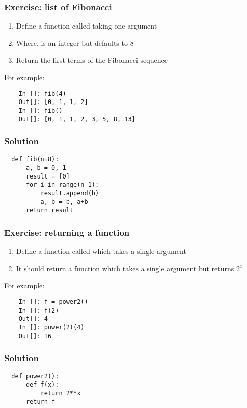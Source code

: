 \documentclass[14pt,compress]{beamer}
\begin{document}
\begin{frame}
  \frametitle{Exercise: list of Fibonacci}
  \begin{enumerate}
  \item Define a function called  taking one argument 
  \item Where,  is an integer but defaults to 8
  \item Return the first  terms of the Fibonacci sequence
  \end{enumerate}
  For example:
  \begin{lstlisting}
    In []: fib(4)
    Out[]: [0, 1, 1, 2]
    In []: fib()
    Out[]: [0, 1, 1, 2, 3, 5, 8, 13]
  \end{lstlisting}
\end{frame}

\begin{frame}
\frametitle{Solution}
\begin{lstlisting}
  def fib(n=8):
      a, b = 0, 1
      result = [0]
      for i in range(n-1):
          result.append(b)
          a, b = b, a+b
      return result
\end{lstlisting}
\end{frame}

\begin{frame}
  \frametitle{Exercise: returning a function}
  \begin{enumerate}
  \item Define a function called  which takes a single argument
  \item It should return a function which takes a single argument  but
    returns $2^x$
  \end{enumerate}
  For example:
  \begin{lstlisting}
    In []: f = power2()
    In []: f(2)
    Out[]: 4
    In []: power(2)(4)
    Out[]: 16
  \end{lstlisting}
\end{frame}

\begin{frame}
\frametitle{Solution}
\begin{lstlisting}
  def power2():
      def f(x):
          return 2**x
      return f
\end{lstlisting}
\end{frame}
\end{document}

